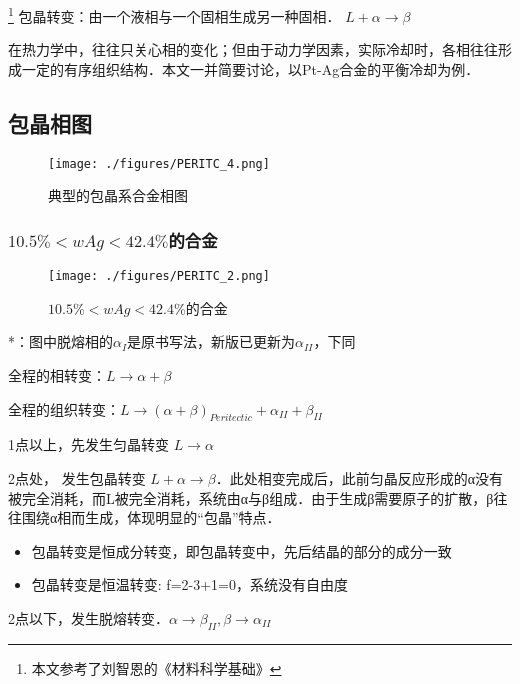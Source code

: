 
\footnote{本文参考了刘智恩的《材料科学基础》}
包晶转变：由一个液相与一个固相生成另一种固相． $L + \alpha \rightarrow \beta$

在热力学中，往往只关心相的变化；但由于动力学因素，实际冷却时，各相往往形成一定的有序组织结构．本文一并简要讨论，以Pt-Ag合金的平衡冷却为例．

\subsection{包晶相图}

\begin{figure}[ht]
\centering
\texttt{[image: ./figures/PERITC\_4.png]}
\caption{典型的包晶系合金相图} \label{PERITC_fig4}
\end{figure}

\subsubsection{$10.5\%<wAg<42.4\%$的合金} 
\begin{figure}[ht]
\centering
\texttt{[image: ./figures/PERITC\_2.png]}
\caption{$10.5\%<wAg<42.4\%$的合金} \label{PERITC_fig2}
\end{figure}
*：图中脱熔相的$\alpha_I$是原书写法，新版已更新为$\alpha_{II}$，下同

全程的相转变：$L \rightarrow \alpha+\beta$

全程的组织转变：$L \rightarrow (\alpha+\beta)_{Peritectic} + \alpha_{II} + \beta_{II}$

1点以上，先发生匀晶转变 $L \rightarrow \alpha$

2点处， 发生包晶转变 $L+ \alpha \rightarrow \beta$．此处相变完成后，此前匀晶反应形成的α没有被完全消耗，而L被完全消耗，系统由α与β组成．由于生成β需要原子的扩散，β往往围绕α相而生成，体现明显的“包晶”特点．
\begin{itemize}
\item 包晶转变是恒成分转变，即包晶转变中，先后结晶的部分的成分一致
\item 包晶转变是恒温转变: f=2-3+1=0，系统没有自由度
\end{itemize}

2点以下，发生脱熔转变．$\alpha \rightarrow \beta_{II}, \beta \rightarrow \alpha_{II}$


